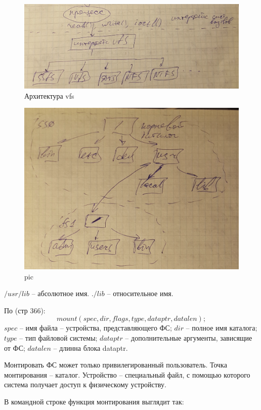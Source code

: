 \begin{figure}[H]
  \centering
  \includegraphics[width=\textwidth]{pic/1.png}
  \caption{Архитектура vfs}
\end{figure}

\begin{figure}[h!]
  \centering
  \includegraphics[width=\textwidth]{pic/2.png}
  \caption{pic}
\end{figure}

$/usr/lib$ – абсолютное имя. $./lib$ – относительное имя.

По \cite{UNIX_Internals} (стр 366):
$$mount (spec, dir, flags, type, dataptr, datalen);$$
$spec$ – имя файла – устройства, представляющего ФС;
$dir$ – полное имя каталога;
$type$ – тип файловой системы;
$dataptr$ – дополнительные аргументы, зависящие от ФС;
$datalen$ – длинна блока dataptr.

Монтировать ФС может только привилегированный пользователь.  Точка монтирования – каталог. Устройство – специальный файл, с помощью которого система получает доступ к физическому устройству. 

В командной строке функция монтирования выглядит так: 


